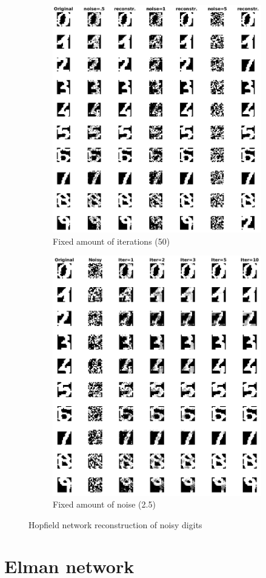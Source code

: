 \documentclass[11pt, a4paper]{article}
\begin{document}
\begin{figure}[H]
    \centering
    \begin{subfigure}{.5\textwidth}
      \centering
      \includegraphics[width=0.90\linewidth]{ndigits_fi1.png}
      \caption{Fixed amount of iterations (50)}
      \label{fig:ndigits1}
    \end{subfigure}%
    \begin{subfigure}{.5\textwidth}
      \centering
      \includegraphics[width=0.85\linewidth]{ndigits_fn2.png}
      \caption{Fixed amount of noise (2.5)}
      \label{fig:ndigits2}
    \end{subfigure}
    \caption{Hopfield network reconstruction of noisy digits}
    \label{fig:ndigit}
\end{figure}

\section{Elman network}



 

\end{document}
